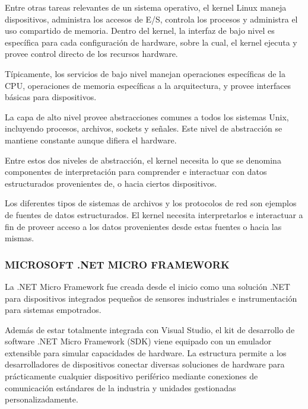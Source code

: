 Entre otras tareas relevantes de un sistema operativo, el kernel Linux maneja dispositivos, administra los accesos de E/S, controla los procesos y administra el uso compartido de memoria. Dentro del kernel, la interfaz de bajo nivel es específica para cada configuración de hardware, sobre la cual, el kernel ejecuta y provee control directo de los recursos hardware. 



Típicamente, los servicios de bajo nivel manejan operaciones específicas de la CPU, operaciones de memoria específicas a la arquitectura, y provee interfaces básicas para dispositivos.



La capa de alto nivel provee abstracciones comunes a todos los sistemas Unix, incluyendo procesos, archivos, sockets y señales. Este nivel de abstracción se mantiene constante aunque difiera el hardware. 



Entre estos dos niveles de abstracción, el kernel necesita lo que se denomina componentes de interpretación para comprender e interactuar con datos estructurados provenientes de, o hacia ciertos dispositivos.



Los diferentes tipos de sistemas de archivos y los protocolos de red son ejemplos de fuentes de datos estructurados. El kernel necesita interpretarlos e interactuar a fin de proveer acceso a los datos provenientes desde estas fuentes o hacia las mismas.



\subsubsection{MICROSOFT .NET MICRO FRAMEWORK}
La .NET Micro Framework fue creada desde el inicio como una solución .NET para dispositivos integrados pequeños de sensores industriales e instrumentación para sistemas empotrados.



Además de estar totalmente integrada con Visual Studio, el kit de desarrollo de software .NET Micro Framework (SDK) viene equipado con un emulador extensible para simular capacidades de hardware. La estructura permite a los desarrolladores de dispositivos conectar diversas soluciones de hardware para prácticamente cualquier dispositivo periférico mediante conexiones de comunicación estándares de la industria y unidades gestionadas personalizadamente.




